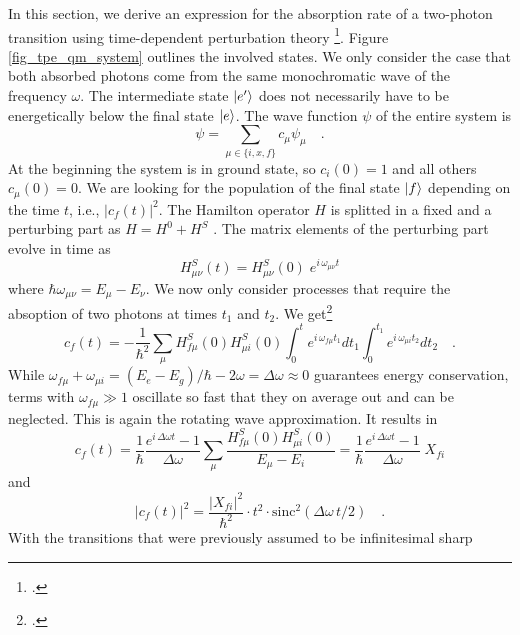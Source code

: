 In this section, we derive an expression for
the absorption rate of a two-photon transition using 
time-dependent perturbation theory
\footcite{Haken_wolf_II,mystre_quantum_optics}.
Figure \ref{fig_tpe_qm_system} outlines the involved
states. We only  consider the case
that both absorbed photons come from the same monochromatic
wave of the frequency $\omega$. The intermediate state 
$\ket{e'}$
does not necessarily have to be energetically below the final state $\ket{e}$.
The wave function $\psi$ of the entire system is
\begin{equation}
\psi = \sum_{\mu \in \{i, x, f\}} c_{\mu} \psi_{\mu} \quad.
\end{equation}
At the beginning the system is in ground state, so $c_i(0)
= 1$ and all others $c_{\mu}(0) = 0$. We are looking for the population
of the final state $\ket{f}$ depending on the time $t$, i.e.,
$|c_f(t)|^2$. The Hamilton operator $H$ is splitted in a fixed and a perturbing part as
 $H = H^0 + H^S$ . 
The matrix elements of the perturbing part evolve in time as
\begin{equation}
H^S_{\mu \nu} (t) = H^S_{\mu \nu} (0) \; e^{i \, \omega_{\mu \nu}
t}
\end{equation}
where $\hbar \omega_{\mu \nu} = E_{\mu} - E_{\nu}$.
We now only consider processes that require the absoption of two photons at times $t_1$ and $t_2$. We get\footcite{Haken_wolf_II}
\begin{equation}
c_f(t) = - \frac{1}{\hbar^2} \sum_{\mu} H^S_{f \mu} (0) H^S_{\mu
i} (0)\int_0^t e^{i \,\omega_{f \mu} t_1} dt_1 \int_0^{t_1} e^{i
\,\omega_{\mu i} t_2} dt_2 \quad .
\end{equation}
While $\omega_{f \mu}+\omega_{ \mu i}= (E_e - E_g)/ \hbar - 2 \omega = \Delta \omega \approx 0$ guarantees  energy conservation,  terms with 
 $\omega_{f \mu} \gg 1$ oscillate so fast that they
on average out and can be neglected. This is again the rotating wave approximation. It  results in
\begin{equation}
c_f(t) =  \frac{1}{\hbar} \frac{e^{i \,\Delta \omega t} -1}{
\Delta \omega } \sum_{\mu} \frac{H^S_{f \mu} (0) H^S_{\mu i}
(0)}{E_{\mu} - E_i} =  \frac{1}{\hbar} \frac{e^{i \,\Delta \omega t}
-1}{ \Delta \omega } \; X_{fi}
\end{equation}
and
\begin{equation}
|c_f(t)|^2 = \frac{|X_{fi}|^2}{\hbar^2} \cdot t^2 \cdot
\text{sinc}^2(\Delta \omega \,t / 2) \quad .
\end{equation}
With the transitions that were previously assumed to be infinitesimal sharp
